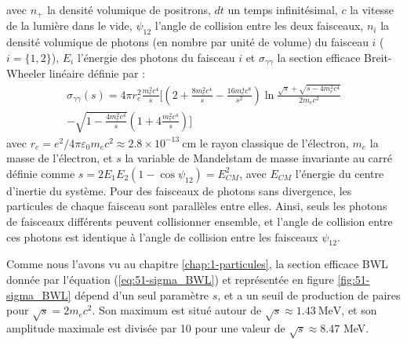 \begin{refsection}
avec $n_+$ la densité volumique de positrons, $dt$ un temps infinitésimal, $c$ la vitesse de la lumière dans le vide, $\psi_{12}$ l'angle de collision entre les deux faisceaux, $n_i$ la densité volumique de photons (en nombre par unité de volume) du faisceau $i$ ($i=\{1,2\}$), $E_i$ l'énergie des photons du faisceau $i$ et $\sigma_{\gamma\gamma}$ la section efficace Breit-Wheeler linéaire définie par \parencite{greiner_2009} :
\begin{equation}
\begin{split}
    \sigma_{\gamma\gamma}(s)= 4 \pi r_e^2 \frac{m_e^2 c^4}{s} \Bigg[ \left(2 + \frac{8 m_e^2 c^4}{s} - \frac{16 m_e^4 c^8}{s^2}\right) \ln \frac{\sqrt{s} + \sqrt{s - 4 m_e^2 c^4}}{2 m_e c^2} \\
    - \sqrt{1 - \frac{4 m_e^2 c^4}{s}}\left(1 + 4 \frac{m_e^2 c^4}{s}\right)\Bigg]
\end{split}
\label{eq:51-sigma_BWL}
\end{equation}
avec $r_e = e^2/4 \pi \varepsilon_0  m_e c^2 \approx 2.8 \times 10^{-13} ~ \si{\cm}$ le rayon classique de l'électron, $m_e$ la masse de l'électron, et $s$ la variable de Mandelstam de masse invariante au carré définie comme $s=2 E_1 E_2 (1-\cos{\psi_{12}}) = E_{CM}^2$, avec $E_{CM}$ l'énergie du centre d'inertie du système. Pour des faisceaux de photons sans divergence, les particules de chaque faisceau sont parallèles entre elles. Ainsi, seuls les photons de faisceaux différents peuvent collisionner ensemble, et l'angle de collision entre ces photons est identique à l'angle de collision entre les faisceaux $\psi_{12}$.

Comme nous l'avons vu au chapitre \ref{chap:1-particules}, la section efficace BWL donnée par l'équation (\ref{eq:51-sigma_BWL}) et représentée en figure \ref{fig:51-sigma_BWL} dépend d'un seul paramètre $s$, et a un seuil de production de paires pour $\sqrt{s}=2 m_e c^2$. Son maximum est situé autour de $\sqrt{s} \approx 1.43 ~ \si{\MeV}$, et son amplitude maximale est divisée par 10 pour une valeur de $\sqrt{s} \approx 8.47$ MeV.


\end{refsection}
